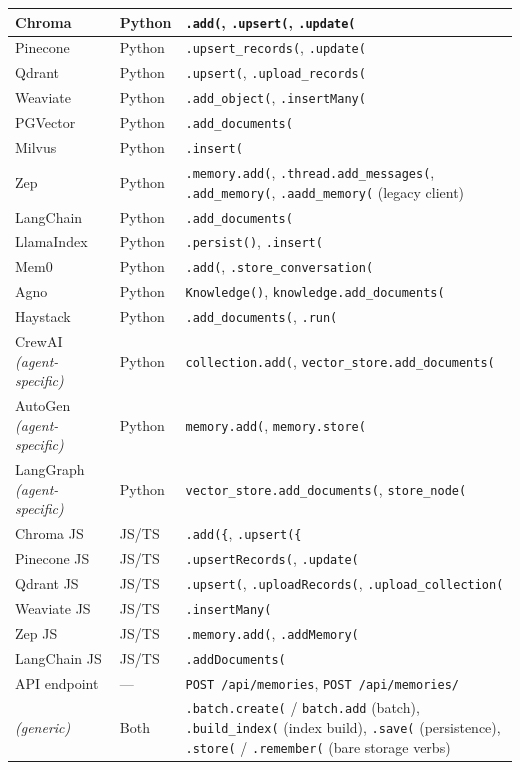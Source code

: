 {\begin{longtable}{@{}p{}p{}p{}@{}}
Chroma & Python & \texttt{.add(}, \texttt{.upsert(}, \texttt{.update(} \\ \midrule
Pinecone & Python & \texttt{.upsert\_records(}, \texttt{.update(} \\ \midrule
Qdrant & Python & \texttt{.upsert(}, \texttt{.upload\_records(} \\ \midrule
Weaviate & Python & \texttt{.add\_object(}, \texttt{.insertMany(} \\ \midrule
PGVector & Python & \texttt{.add\_documents(} \\ \midrule
Milvus & Python & \texttt{.insert(} \\ \midrule
Zep & Python & \texttt{.memory.add(}, \texttt{.thread.add\_messages(}, \texttt{.add\_memory(}, \texttt{.aadd\_memory(} (legacy client) \\ \midrule
LangChain & Python & \texttt{.add\_documents(} \\ \midrule
LlamaIndex & Python & \texttt{.persist()}, \texttt{.insert(} \\ \midrule
Mem0 & Python & \texttt{.add(}, \texttt{.store\_conversation(} \\ \midrule
Agno & Python & \texttt{Knowledge()}, \texttt{knowledge.add\_documents(} \\ \midrule
Haystack & Python & \texttt{.add\_documents(}, \texttt{.run(} \\ \midrule
CrewAI \textit{(agent-specific)} & Python & \texttt{collection.add(}, \texttt{vector\_store.add\_documents(} \\ \midrule
AutoGen \textit{(agent-specific)} & Python & \texttt{memory.add(}, \texttt{memory.store(} \\ \midrule
LangGraph \textit{(agent-specific)} & Python & \texttt{vector\_store.add\_documents(}, \texttt{store\_node(} \\ \midrule
Chroma JS & JS/TS & \texttt{.add(\{}, \texttt{.upsert(\{} \\ \midrule
Pinecone JS & JS/TS & \texttt{.upsertRecords(}, \texttt{.update(} \\ \midrule
Qdrant JS & JS/TS & \texttt{.upsert(}, \texttt{.uploadRecords(}, \texttt{.upload\_collection(} \\ \midrule
Weaviate JS & JS/TS & \texttt{.insertMany(} \\ \midrule
Zep JS & JS/TS & \texttt{.memory.add(}, \texttt{.addMemory(} \\ \midrule
LangChain JS & JS/TS & \texttt{.addDocuments(} \\ \midrule
API endpoint & --- & \texttt{POST /api/memories}, \texttt{POST /api/memories/} \\ \midrule
\textit{(generic)} & Both & \texttt{.batch.create(} / \texttt{batch.add} (batch), \texttt{.build\_index(} (index build), \texttt{.save(} (persistence), \texttt{.store(} / \texttt{.remember(} (bare storage verbs) \\ \midrule

\end{longtable}
}
